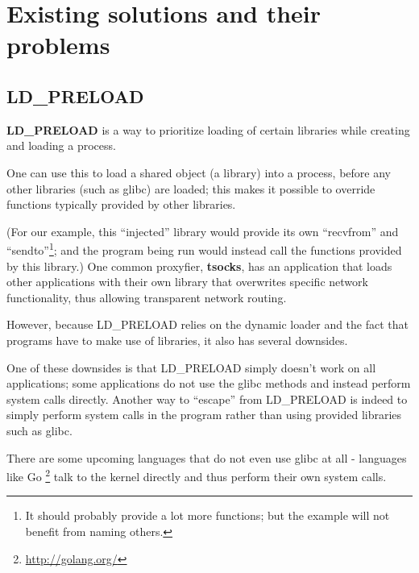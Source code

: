 \documentclass[a4paper, twoside, 10pt, twocolumn]{report}
\begin{document}


%

\section{Existing solutions and their problems}

\subsection{LD\_PRELOAD}

\textbf{LD\_PRELOAD} is a way to prioritize loading of certain libraries
while creating and loading a process.

One can use this to load a shared object (a library) into a process,
before any other libraries (such as glibc) are loaded;
this makes it possible to override functions typically provided by other
libraries.

(For our example, this ``injected'' library would provide its own
``recvfrom'' and ``sendto''\footnote{It should probably provide
a lot more functions; but the example will not benefit from naming others.};
and the program being run
would instead call the functions provided by this library.) One common
proxyfier, \textbf{tsocks}, has an application that loads other applications
with their own library that overwrites specific network functionality,
thus allowing transparent network routing.

However, because LD\_PRELOAD relies on the dynamic loader and the fact that
programs have to make use of libraries, it also has several downsides.

One of these downsides is that LD\_PRELOAD simply doesn't work on all
applications; some applications do not use the glibc methods and instead
perform system calls directly. Another way to ``escape'' from LD\_PRELOAD
is indeed to simply perform system calls in the program rather than using
provided libraries such as glibc.

There are some upcoming languages that do not even use glibc at all - languages
like Go \footnote{\url{http://golang.org/}} talk to the kernel directly and
thus perform their own system calls.
\end{document}
